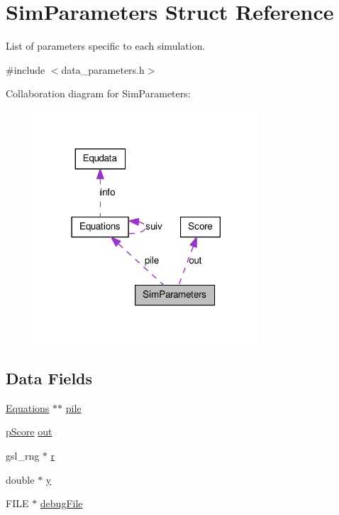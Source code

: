 \hypertarget{structSimParameters}{
\section{SimParameters Struct Reference}
\label{structSimParameters}
}


List of parameters specific to each simulation.  




{\ttfamily \#include $<$data\_\-parameters.h$>$}



Collaboration diagram for SimParameters:\nopagebreak
\begin{figure}[H]
\begin{center}
\leavevmode
\includegraphics[width=237pt]{structSimParameters__coll__graph}
\end{center}
\end{figure}
\subsection*{Data Fields}
\begin{DoxyCompactItemize}
\item 
\hyperlink{structEquations}{Equations} $\ast$$\ast$ \hyperlink{structSimParameters_aecbff20f6647d4d348d3026e166a5c93}{pile}
\item 
\hyperlink{structScore}{pScore} \hyperlink{structSimParameters_a0dc198d74946f531dbf36860796bf108}{out}
\item 
gsl\_\-rng $\ast$ \hyperlink{structSimParameters_a3657bf540ffac966ca5e6e48595370ac}{r}
\item 
double $\ast$ \hyperlink{structSimParameters_aba46fa332475a2c74856712fa0ca10a0}{y}
\item 
FILE $\ast$ \hyperlink{structSimParameters_aad7fb1c37993627a2c2c04b7509ce3c0}{debugFile}
\end{DoxyCompactItemize}


